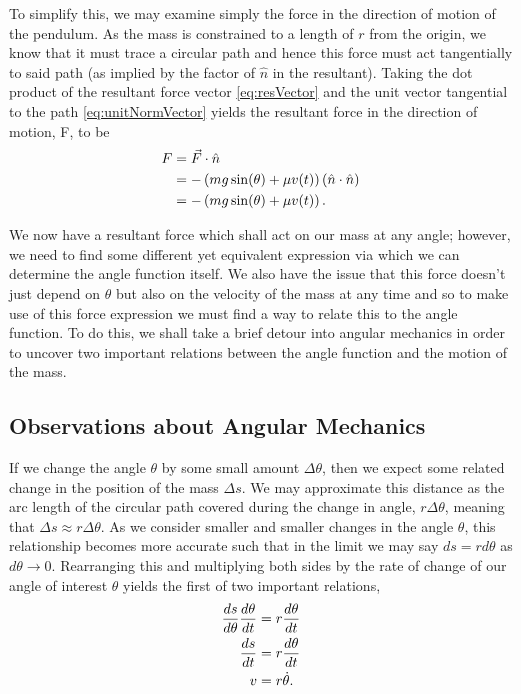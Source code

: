\documentclass{article}
\begin{document}
To simplify this, we may examine simply the force in the direction of motion of the pendulum. As the mass is constrained to a length of $r$ from the origin, we know that it must trace a circular path and hence this force must act tangentially to said path (as implied by the factor of $\hat{n}$ in the resultant). Taking the dot product of the resultant force vector \eqref{eq:resVector} and the unit vector tangential to the path \eqref{eq:unitNormVector} yields the resultant force in the direction of motion, F, to be
\begin{align}
	F &= \vec{F} \cdot \hat{n} \notag \\
	&= -\left(mg\sin(\theta) + \mu v(t)\right)(\hat{n} \cdot \hat{n}) \notag \\
	&= -\left(mg\sin(\theta) + \mu v(t)\right). \label{eq:resWithVel}
\end{align}

We now have a resultant force which shall act on our mass at any angle; however, we need to find some different yet equivalent expression via which we can determine the angle function itself. We also have the issue that this force doesn't just depend on $\theta$ but also on the velocity of the mass at any time and so to make use of this force expression we must find a way to relate this to the angle function. To do this, we shall take a brief detour into angular mechanics in order to uncover two important relations between the angle function and the motion of the mass.

\subsection{Observations about Angular Mechanics}

If we change the angle $\theta$ by some small amount $\Delta\theta$, then we expect some related change in the position of the mass $\Delta s$. We may approximate this distance as the arc length of the circular path covered during the change in angle, $r\Delta\theta$, meaning that $\Delta s \approx r\Delta\theta$. As we consider smaller and smaller changes in the angle $\theta$, this relationship becomes more accurate such that in the limit we may say $ds = rd\theta$ as $d\theta \to 0$. Rearranging this and multiplying both sides by the rate of change of our angle of interest $\theta$ yields the first of two important relations,
\begin{align}
	\frac{ds}{d\theta}\frac{d\theta}{dt} &= r\frac{d\theta}{dt} \notag \\
	\frac{ds}{dt} &= r\frac{d\theta}{dt} \notag \\
	v &= r\dot{\theta}. \label{eq:velRelation}
\end{align}
\end{document}
